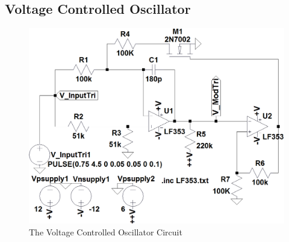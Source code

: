 \documentclass[paper]{IEEEtran}
\begin{document}
\subsection{Voltage Controlled Oscillator}
\begin{figure}[h!]
 \setlength{\unitlength}{\textwidth}
 \center 
 \includegraphics[width=0.45\unitlength]{VCO_Circuit_FinalModified}
 \caption{\label{fig:VCO_Circuit}The Voltage Controlled Oscillator Circuit}
\end{figure}
\end{document}
